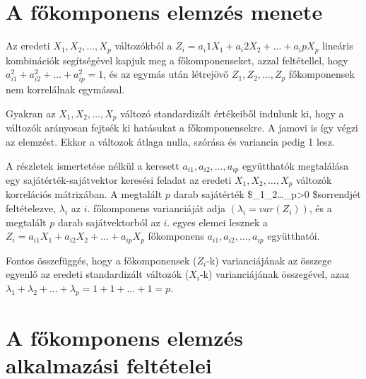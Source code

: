 \documentclass[
  letterpaper,
]{krantz}
\begin{document}
\hypertarget{a-fux151komponens-elemzuxe9s-menete}{%
\section{A főkomponens elemzés
menete}\label{a-fux151komponens-elemzuxe9s-menete}}

Az eredeti \(X_1,X_2,\dots,X_p\) változókból a
\(Z_i=a_i1 X_1+ a_i2 X_2+\dots + a_ip X_p\) lineáris kombinációk
segítségével kapjuk meg a főkomponenseket, azzal feltétellel, hogy
\(a_{i1}^2+a_{i2}^2+\dots+a_{ip}^2=1\), és az egymás után létrejövő
\(Z_1,Z_2,…,Z_p\) főkomponensek nem korrelálnak egymással.

Gyakran az \(X_1,X_2,\dots,X_p\) változó standardizált értékeiből
indulunk ki, hogy a változók arányosan fejtsék ki hatásukat a
főkomponensekre. A jamovi is így végzi az elemzést. Ekkor a változok
átlaga nulla, szórása és variancia pedig 1 lesz.

A részletek ismertetése nélkül a keresett \(a_{i1},a_{i2},\dots,a_{ip}\)
együtthatók megtalálása egy sajátérték-sajátvektor keresési feladat az
eredeti \(X_1,X_2,\dots,X_p\) változók korrelációs mátrixában. A
megtalált \(p\) darab sajátérték
\$\lambda\_1\geq\lambda\_2\geq\dots\geq\lambda\_p\textgreater0
\$sorrendjét feltételezve, \(\lambda_i\) az \(i.\) főkomponens
varianciáját adja \((\lambda_i=var(Z_i))\), és a megtalált \(p\) darab
sajátvektorból az \(i.\) egyes elemei lesznek a
\(Z_i=a_{i1} X_1+ a_{i2} X_2+\dots+ a_{ip} X_p\) főkomponens
\(a_{i1},a_{i2},\dots,a_{ip}\) együtthatói.

Fontos összefüggés, hogy a főkomponensek (\(Z_i\)-k) varianciájának az
összege egyenlő az eredeti standardizált változók (\(X_i\)-k)
varianciájának összegével, azaz
\(\lambda_1+\lambda_2+\dots+\lambda_p=1+1+\dots+1=p.\)

\hypertarget{a-fux151komponens-elemzuxe9s-alkalmazuxe1si-feltuxe9telei}{%
\section{A főkomponens elemzés alkalmazási
feltételei}\label{a-fux151komponens-elemzuxe9s-alkalmazuxe1si-feltuxe9telei}}
\end{document}
